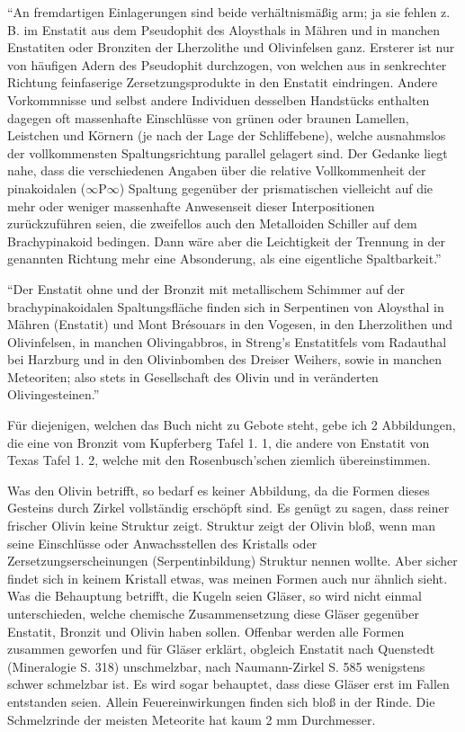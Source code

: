 \documentclass[a4paper, 12pt, oneside]{article}
\begin{document}
"`An fremdartigen Einlagerungen sind beide verhältnismäßig arm; ja sie fehlen z. B. im Enstatit aus dem Pseudophit des Aloysthals in Mähren und in manchen Enstatiten oder Bronziten der Lherzolithe und Olivinfelsen ganz. Ersterer ist nur von häufigen Adern des Pseudophit durchzogen, von welchen aus in senkrechter Richtung feinfaserige Zersetzungsprodukte in den Enstatit eindringen. Andere Vorkommnisse und selbst andere Individuen desselben Handstücks enthalten dagegen oft massenhafte Einschlüsse von grünen oder braunen Lamellen, Leistchen und Körnern (je nach der Lage der Schliffebene), welche ausnahmslos der vollkommensten Spaltungsrichtung parallel gelagert sind. Der Gedanke liegt nahe, dass die verschiedenen Angaben über die relative Vollkommenheit der pinakoidalen ($\infty$P$\infty$) Spaltung gegenüber der prismatischen vielleicht auf die mehr oder weniger massenhafte Anwesenseit dieser Interpositionen zurückzuführen seien, die zweifellos auch den Metalloiden Schiller auf dem Brachypinakoid bedingen. Dann wäre aber die Leichtigkeit der Trennung in der genannten Richtung mehr eine Absonderung, als eine eigentliche Spaltbarkeit."'

"`Der Enstatit ohne und der Bronzit mit metallischem Schimmer auf der brachypinakoidalen Spaltungsfläche finden sich in Serpentinen von Aloysthal in Mähren (Enstatit) und Mont Brésouars in den Vogesen, in den Lherzolithen und Olivinfelsen, in manchen Olivingabbros, in Streng's Enstatitfels vom Radauthal bei Harzburg und in den Olivinbomben des Dreiser Weihers, sowie in manchen Meteoriten; also stets in Gesellschaft des Olivin und in veränderten Olivingesteinen."'

Für diejenigen, welchen das Buch nicht zu Gebote steht, gebe ich 2 Abbildungen, die eine von Bronzit vom Kupferberg Tafel 1. 1, die andere von Enstatit von Texas Tafel 1. 2, welche mit den Rosenbusch'schen ziemlich übereinstimmen.

Was den Olivin betrifft, so bedarf es keiner Abbildung, da die Formen dieses Gesteins durch Zirkel vollständig erschöpft sind. Es genügt zu sagen, dass reiner frischer Olivin keine Struktur zeigt. Struktur zeigt der Olivin bloß, wenn man seine Einschlüsse oder Anwachsstellen des Kristalls oder Zersetzungserscheinungen (Serpentinbildung) Struktur nennen wollte. Aber sicher findet sich in keinem Kristall etwas, was meinen Formen auch nur ähnlich sieht. Was die Behauptung betrifft, die Kugeln seien Gläser, so wird nicht einmal unterschieden, welche chemische Zusammensetzung diese Gläser gegenüber Enstatit, Bronzit und Olivin haben sollen. Offenbar werden alle Formen zusammen geworfen und für Gläser erklärt, obgleich Enstatit nach Quenstedt (Mineralogie S. 318) unschmelzbar, nach Naumann-Zirkel S. 585 wenigstens schwer schmelzbar ist. Es wird sogar behauptet, dass diese Gläser erst im Fallen entstanden seien. Allein Feuereinwirkungen finden sich bloß in der Rinde. Die Schmelzrinde der meisten Meteorite hat kaum 2 mm Durchmesser.
\end{document}
